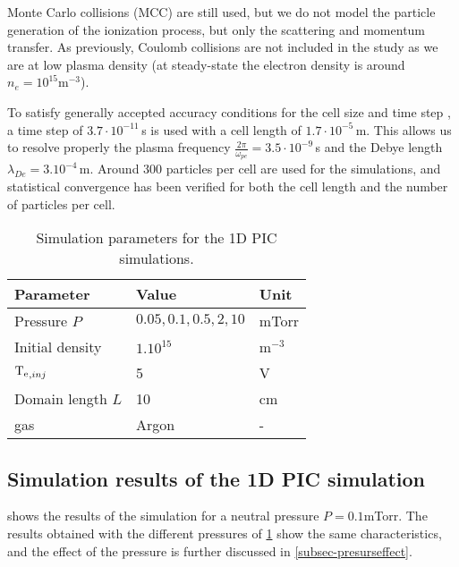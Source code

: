     Monte Carlo collisions (MCC) are still used, but we do not model the particle generation of the ionization process, but only the scattering and momentum transfer.
    As previously, Coulomb collisions are not included in the study as we are at low plasma density (at steady-state the electron density is around $n_e = 10^{15}$m$^{-3}$).

    To satisfy generally accepted accuracy conditions for the cell size and time step \citep{turner2013}, a time step of $3.7\cdot10^{-11}$\,s is used with a cell length of $1.7\cdot10^{-5}$\,m.
    This allows us to resolve properly the plasma frequency $\frac{2 \pi}{\omega_{pe}} = 3.5\cdot10^{-9} $\,s and the Debye length $\lambda_{De} = 3.10^{-4}$\,m.
    Around $300$ particles per cell are used for the simulations, and statistical convergence has been verified for both the cell length and the number of particles per cell.


    \begin{table}
      \centering
      \begin{tabular}{lll}  \toprule
        Parameter & Value & Unit  \\ \midrule
        Pressure $P$ & $0.05,0.1,0.5, 2, 10$ & mTorr\\
        Initial density & $1 .10^{15}$ & m$^{-3}$\\
        $\mathrm{T_e}_{, inj}$& 5 & V\\
        Domain length $L$ & 10 & cm\\
        gas & Argon & -\\
        \bottomrule
      \end{tabular}
      \caption{Simulation parameters for the 1D PIC simulations.}
      \label{tab_1DPICParams}
    \end{table}


  \subsection{Simulation results of the \acs{1D} \acs{PIC} simulation} \label{subsec-1DPIC_results}

     shows the results of the simulation for a neutral pressure $P=0.1$mTorr.
    The results obtained with the different pressures of \cref{tab_1DPICParams} show the same characteristics, and the effect of the pressure is further discussed in \cref{subsec-presurseffect}.
    
